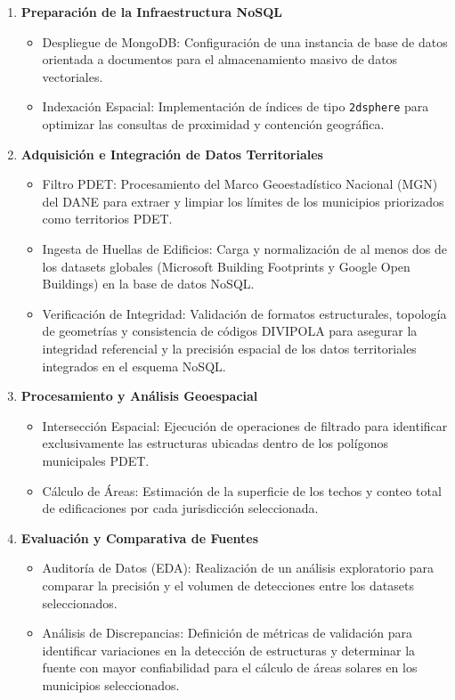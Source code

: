 \documentclass{article}
\begin{document}
\begin{enumerate}
    \item \textbf{Preparación de la Infraestructura NoSQL}
    \begin{itemize}
        \item Despliegue de MongoDB: Configuración de una instancia de base de datos orientada a documentos para el almacenamiento masivo de datos vectoriales.
        \item Indexación Espacial: Implementación de índices de tipo \texttt{2dsphere} para optimizar las consultas de proximidad y contención geográfica.
    \end{itemize}

    \item \textbf{Adquisición e Integración de Datos Territoriales}
    \begin{itemize}
        \item Filtro PDET: Procesamiento del Marco Geoestadístico Nacional (MGN) del DANE para extraer y limpiar los límites de los municipios priorizados como territorios PDET.
        \item Ingesta de Huellas de Edificios: Carga y normalización de al menos dos de los datasets globales (Microsoft Building Footprints y Google Open Buildings) en la base de datos NoSQL.
        \item Verificación de Integridad: Validación de formatos estructurales, topología de geometrías y consistencia de códigos DIVIPOLA para asegurar la integridad referencial y la precisión espacial de los datos territoriales integrados en el esquema NoSQL.
    \end{itemize}

    \item \textbf{Procesamiento y Análisis Geoespacial}
    \begin{itemize}
        \item Intersección Espacial: Ejecución de operaciones de filtrado para identificar exclusivamente las estructuras ubicadas dentro de los polígonos municipales PDET.
        \item Cálculo de Áreas: Estimación de la superficie de los techos y conteo total de edificaciones por cada jurisdicción seleccionada.
    \end{itemize}

    \item \textbf{Evaluación y Comparativa de Fuentes}
    \begin{itemize}
        \item Auditoría de Datos (EDA): Realización de un análisis exploratorio para comparar la precisión y el volumen de detecciones entre los datasets seleccionados.
        \item Análisis de Discrepancias: Definición de métricas de validación para identificar variaciones en la detección de estructuras y determinar la fuente con mayor confiabilidad para el cálculo de áreas solares en los municipios seleccionados.
    \end{itemize}


\end{enumerate}
\end{document}
